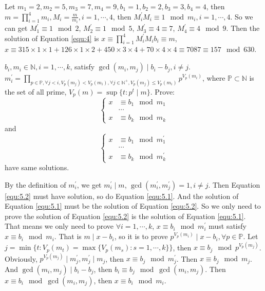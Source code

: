\documentclass{ctexart}
\begin{document}
\begin{solution}
  Let \(m_1=2,m_2=5,m_3=7,m_4=9,b_1=1,b_2=2,b_3=3,b_4=4\), then \(m=\prod_{i=1}^{4} m_i, M_i=\frac{m}{m_i},i=1,\cdots,4\),
  then \(M_i^{'}M_i \equiv 1 \mod m_i, i=1,\cdots,4\). So we can get \(M_1^{'} \equiv 1 \mod 2\),
  \(M_2^{'} \equiv 1 \mod 5\), \(M_3^{'} \equiv 4 \equiv 7\), \(M_4^{'} \equiv 4 \mod 9\).
  Then the solution of Equation \eqref{equ:4} is \(x \equiv \prod_{i=1}^{4} M_i^{'}M_ib_i \equiv m\),
  \(x \equiv 315 \times 1 \times 1 + 126 \times 1 \times 2 + 450 \times 3 \times 4 + 70 \times 4 \times 4 \equiv 7087 \equiv 157 \mod 630\).
\end{solution}
\begin{problem}\label{pro:5}
  \(b_i, m_i \in \mathbb{N}, i=1,\cdots,k\), satisfy \(\gcd(m_i,m_j) \mid b_i-b_j, i \neq j\).
  \(m_i^{'} = \prod_{p \in \mathbb{P}, \forall j < i, V_{p}(m_j) < V_p(m_i), \forall j \in \mathbb{N}^+, V_p(m_j)\leq V_p(m_i)}p^{V_p(m_i)}\),
  where \(\mathbb{P} \subset \mathbb{N}\) is the set of all prime, \(V_p(m)=\sup \{t:p^t \mid m\}\).
  Prove:
  \begin{equation}\label{equ:5.1}
    \begin{cases}
      x & \equiv b_1 \mod m_1 \\
        & \cdots              \\
      x & \equiv b_k \mod m_k
    \end{cases}
  \end{equation}
  and
  \begin{equation}\label{equ:5.2}
    \begin{cases}
      x & \equiv b_1 \mod m_1^{'} \\
        & \cdots                  \\
      x & \equiv b_k \mod m_k^{'}
    \end{cases}
  \end{equation}
  have same solutions.
\end{problem}
\begin{solution}
  By the definition of \(m_i^{'}\), we get \(m_i^{'} \mid m\), \(\gcd(m_i^{'},m_j^{'})=1, i \neq j\).
  Then Equation \eqref{equ:5.2} must have solution, so do Equation \eqref{equ:5.1}.
  And the solution of Equation \eqref{equ:5.1}
  must be the solution of Equation \eqref{equ:5.2}. So we only need to prove the solution of Equation \eqref{equ:5.2}
  is the solution of Equation \eqref{equ:5.1}. That means we only need to prove \(\forall i =1,\cdots,k\),
  \(x \equiv b_i \mod m_i^{'}\) must satisfy \(x \equiv b_i \mod m_i\).
  That is \(m \mid x-b_i\), so it is to prove \(p^{V_p(m_i)} \mid x-b_i, \forall p \in \mathbb{P}\).
  Let \(j = \min \{t: V_p(m_t)= \max \{V_p(m_s): s=1,\cdots,k\}\}\),
  then \(x \equiv b_j \mod p^{V_p(m_j)}\). Obviously, \(p^{V_p(m_j)} \mid m_j^{'}, m_j^{'} \mid m_j \), then \(x \equiv b_j \mod m_j^{'}\).
  Then \(x \equiv b_j \mod m_j\). And \(\gcd(m_i,m_j) \mid b_i-b_j\), then \(b_i \equiv b_j \mod \gcd(m_i,m_j)\).
  Then \(x \equiv b_i \mod \gcd(m_i,m_j)\), then \(x \equiv b_i \mod m_i\).
\end{solution}
\end{document}
